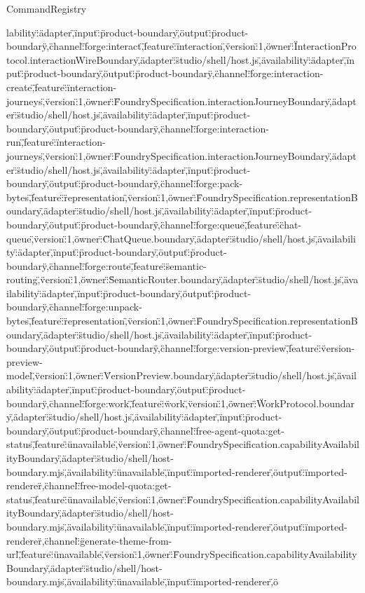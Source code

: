 \begin{lexlean}{CommandRegistry}
\begin{semanticmodule}
{lability\":\"adapter\",\"input\":\"product-boundary\",\"output\":\"product-boundary\"},{\"channel\":\"forge:interact\",\"feature\":\"interaction\",\"version\":1,\"owner\":\"InteractionProtocol.interactionWireBoundary\",\"adapter\":\"studio/shell/host.js\",\"availability\":\"adapter\",\"input\":\"product-boundary\",\"output\":\"product-boundary\"},{\"channel\":\"forge:interaction-create\",\"feature\":\"interaction-journeys\",\"version\":1,\"owner\":\"FoundrySpecification.interactionJourneyBoundary\",\"adapter\":\"studio/shell/host.js\",\"availability\":\"adapter\",\"input\":\"product-boundary\",\"output\":\"product-boundary\"},{\"channel\":\"forge:interaction-run\",\"feature\":\"interaction-journeys\",\"version\":1,\"owner\":\"FoundrySpecification.interactionJourneyBoundary\",\"adapter\":\"studio/shell/host.js\",\"availability\":\"adapter\",\"input\":\"product-boundary\",\"output\":\"product-boundary\"},{\"channel\":\"forge:pack-bytes\",\"feature\":\"representation\",\"version\":1,\"owner\":\"FoundrySpecification.representationBoundary\",\"adapter\":\"studio/shell/host.js\",\"availability\":\"adapter\",\"input\":\"product-boundary\",\"output\":\"product-boundary\"},{\"channel\":\"forge:queue\",\"feature\":\"chat-queue\",\"version\":1,\"owner\":\"ChatQueue.boundary\",\"adapter\":\"studio/shell/host.js\",\"availability\":\"adapter\",\"input\":\"product-boundary\",\"output\":\"product-boundary\"},{\"channel\":\"forge:route\",\"feature\":\"semantic-routing\",\"version\":1,\"owner\":\"SemanticRouter.boundary\",\"adapter\":\"studio/shell/host.js\",\"availability\":\"adapter\",\"input\":\"product-boundary\",\"output\":\"product-boundary\"},{\"channel\":\"forge:unpack-bytes\",\"feature\":\"representation\",\"version\":1,\"owner\":\"FoundrySpecification.representationBoundary\",\"adapter\":\"studio/shell/host.js\",\"availability\":\"adapter\",\"input\":\"product-boundary\",\"output\":\"product-boundary\"},{\"channel\":\"forge:version-preview\",\"feature\":\"version-preview-model\",\"version\":1,\"owner\":\"VersionPreview.boundary\",\"adapter\":\"studio/shell/host.js\",\"availability\":\"adapter\",\"input\":\"product-boundary\",\"output\":\"product-boundary\"},{\"channel\":\"forge:work\",\"feature\":\"work\",\"version\":1,\"owner\":\"WorkProtocol.boundary\",\"adapter\":\"studio/shell/host.js\",\"availability\":\"adapter\",\"input\":\"product-boundary\",\"output\":\"product-boundary\"},{\"channel\":\"free-agent-quota:get-status\",\"feature\":\"unavailable\",\"version\":1,\"owner\":\"FoundrySpecification.capabilityAvailabilityBoundary\",\"adapter\":\"studio/shell/host-boundary.mjs\",\"availability\":\"unavailable\",\"input\":\"imported-renderer\",\"output\":\"imported-renderer\"},{\"channel\":\"free-model-quota:get-status\",\"feature\":\"unavailable\",\"version\":1,\"owner\":\"FoundrySpecification.capabilityAvailabilityBoundary\",\"adapter\":\"studio/shell/host-boundary.mjs\",\"availability\":\"unavailable\",\"input\":\"imported-renderer\",\"output\":\"imported-renderer\"},{\"channel\":\"generate-theme-from-url\",\"feature\":\"unavailable\",\"version\":1,\"owner\":\"FoundrySpecification.capabilityAvailabilityBoundary\",\"adapter\":\"studio/shell/host-boundary.mjs\",\"availability\":\"unavailable\",\"input\":\"imported-renderer\",\"o}
\end{semanticmodule}
\end{lexlean}
